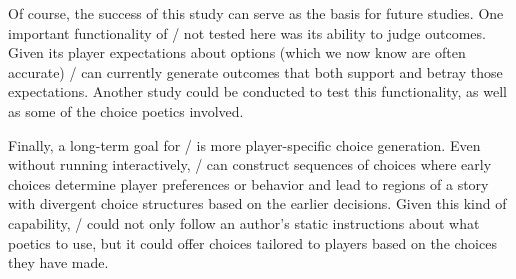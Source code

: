 Of course, the success of this study can serve as the basis for future studies.
%
One important functionality of \dunyazad/ not tested here was its ability to judge outcomes.
%
Given its player expectations about options (which we now know are often accurate) \dunyazad/ can currently generate outcomes that both support and betray those expectations.
%
Another study could be conducted to test this functionality, as well as some of the choice poetics involved.


Finally, a long-term goal for \dunyazad/ is more player-specific choice generation.
%
Even without running interactively, \dunyazad/ can construct sequences of choices where early choices determine player preferences or behavior and lead to regions of a story with divergent choice structures based on the earlier decisions.
%
Given this kind of capability, \dunyazad/ could not only follow an author's static instructions about what poetics to use, but it could offer choices tailored to players based on the choices they have made.
